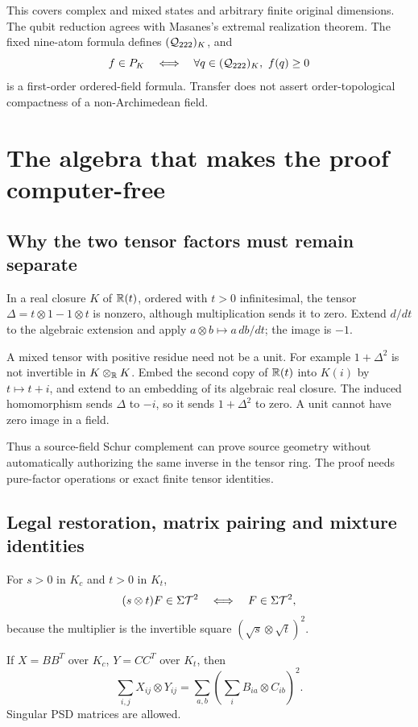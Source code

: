 This covers complex and mixed states and arbitrary finite original
dimensions. The qubit reduction agrees with Masanes's extremal
realization theorem. 
The fixed nine-atom formula defines \((\mathcal Q_{222})_K\), and
\[
 f\in P_K\quad\Longleftrightarrow\quad
 \forall q\in(\mathcal Q_{222})_K,\ f(q)\ge0
\]
is a first-order ordered-field formula. Transfer does not assert
order-topological compactness of a non-Archimedean field.

\section{The algebra that makes the proof computer-free}

\subsection{Why the two tensor factors must remain separate}

In a real closure \(K\) of \(\mathbb R(t)\), ordered with \(t>0\)
infinitesimal, the tensor
\(\Delta=t\otimes1-1\otimes t\) is nonzero, although multiplication
sends it to zero. Extend \(d/dt\) to the algebraic extension and apply
\(a\otimes b\mapsto a\,db/dt\); the image is \(-1\).

A mixed tensor with positive residue need not be a unit.
For example \(1+\Delta^2\) is not invertible in \(K\otimes_\mathbb R K\).
Embed the second copy of \(\mathbb R(t)\) into \(K(i)\) by \(t\mapsto t+i\),
and extend to an embedding of its algebraic real closure. The induced
homomorphism sends \(\Delta\) to \(-i\), so it sends \(1+\Delta^2\)
to zero. A unit cannot have zero image in a field.

Thus a source-field Schur complement can prove source geometry without
automatically authorizing the same inverse in the tensor ring.
The proof needs pure-factor operations or exact finite tensor identities.

\subsection{Legal restoration, matrix pairing and mixture identities}

For \(s>0\) in \(K_c\) and \(t>0\) in \(K_t\),
\[
 (s\otimes t)F\in\Sigma\mathcal T^2\quad\Longleftrightarrow\quad F\in\Sigma\mathcal T^2,
\]
because the multiplier is the invertible square
\((\sqrt s\otimes\sqrt t)^2\).

If \(X=BB^T\) over \(K_c\), \(Y=CC^T\) over \(K_t\), then
\begin{equation}
 \sum_{i,j}X_{ij}\otimes Y_{ij}
 =\sum_{a,b}\left(\sum_iB_{ia}\otimes C_{ib}\right)^2.
 \label{eq:pair}
\end{equation}
Singular PSD matrices are allowed.

